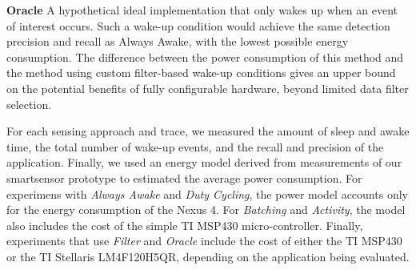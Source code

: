 \textbf{Oracle} A hypothetical ideal implementation that only wakes up
when an event of interest occurs.  Such a wake-up condition would
achieve the same detection precision and recall as Always Awake, with
the lowest possible energy consumption. The difference between the
power consumption of this method and the method using custom
filter-based wake-up conditions gives an upper bound on the potential
benefits of fully configurable hardware, beyond limited data filter
selection.

For each sensing approach and trace, we measured the amount of sleep
and awake time, the total number of wake-up events, and the recall and
precision of the application.  Finally, we used an energy model
derived from measurements of our smartsensor prototype to estimated
the average power consumption.  For experimens with {\em Always Awake}
and {\em Duty Cycling}, the power model accounts only for the energy
consumption of the Nexus 4.  For {\em Batching} and {\em Activity},
the model also includes the cost of the simple TI MSP430
micro-controller.  Finally, experiments that use {\em Filter} and {\em
  Oracle} include the cost of either the TI MSP430 or the TI Stellaris
LM4F120H5QR, depending on the application being evaluated.








